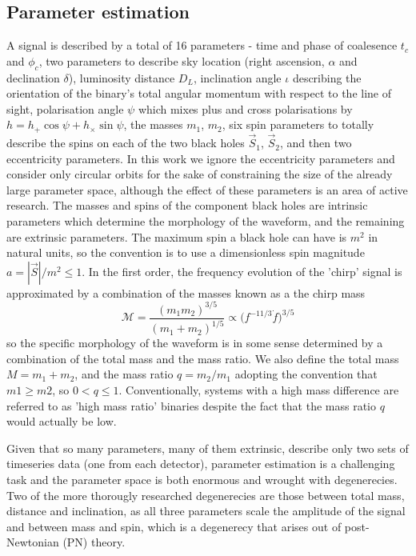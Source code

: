 \documentclass[11pt]{article}
\begin{document}
\subsection{Parameter estimation}
A signal is described by a total of 16 parameters\cite{props} - time and phase of coalesence $t_c$ and $\phi_c$, two parameters to describe sky location (right ascension, $\alpha$ and declination $\delta$), luminosity distance $D_L$, inclination angle $\iota$ describing the orientation of the binary's total angular momentum with respect to the line of sight, polarisation angle $\psi$ which mixes plus and cross polarisations by $h=h_+\cos\psi+h_\times\sin\psi$, the masses $m_1$, $m_2$, six spin parameters to totally describe the spins on each of the two black holes $\vec{S}_1$, $\vec{S}_2$, and then two eccentricity parameters. In this work we ignore the eccentricity parameters and consider only circular orbits for the sake of constraining the size of the already large parameter space, although the effect of these parameters is an area of active research. The masses and spins of the component black holes are intrinsic parameters which determine the morphology of the waveform, and the remaining are extrinsic parameters. The maximum spin a black hole can have is $m^2$ in natural units, so the convention is to use a dimensionless spin magnitude $a=|\vec{S}|/m^2 \leq 1$. In the first order, the frequency evolution of the 'chirp' signal is approximated by a combination of the masses known as a the chirp mass
\begin{equation}
\mathcal{M}=\frac{(m_1m_2)^{3/5}}{(m_1+m_2)^{1/5}}\propto \bigg(f^{-11/3}\dot{f}\bigg)^{3/5}
\end{equation}
so the specific morphology of the waveform is in some sense determined by a combination of the total mass and the mass ratio. We also define the total mass $M=m_1+m_2$, and the mass ratio $q=m_2/m_1$ adopting the convention that $m1\geq m2$, so $0<q\leq1$. Conventionally, systems with a high mass difference are referred to as 'high mass ratio' binaries despite the fact that the mass ratio $q$ would actually be low.

Given that so many parameters, many of them extrinsic, describe only two sets of timeseries data (one from each detector), parameter estimation is a challenging task and the parameter space is both enormous and wrought with degenerecies. Two of the more thorougly researched degenerecies are those between total mass, distance and inclination, as all three parameters scale the amplitude of the signal and between mass and spin\cite{spindegen}, which is a degenerecy that arises out of post-Newtonian (PN) theory. 
\end{document}

